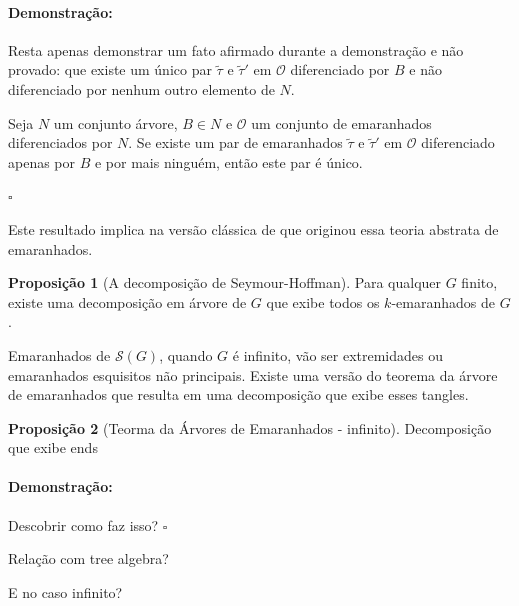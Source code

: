 \documentclass[11pt]{article}
\newcommand{\pulinho}{\vspace{.5cm}}
\theoremstyle{definition}
\theoremstyle{definition}
\theoremstyle{definition}
\newtheorem{prop}{Proposição}
\newenvironment{proposicao}{
\definecolor{shadecolor}{HTML}{FFDBDF}
\begin{shaded}
\begin{prop}
}
{
\end{prop}
\end{shaded}
}
\theoremstyle{definition}
\theoremstyle{definition}
\theoremstyle{definition}
\theoremstyle{definition}
\theoremstyle{definition}
\theoremstyle{definition}
\theoremstyle{definition}
\theoremstyle{definition}
\theoremstyle{definition}
\newtheorem*{veronica*}{Lema}
\newenvironment{lema*}{
\definecolor{shadecolor}{HTML}{FFF1F2}
\begin{shaded}
\begin{veronica*}
}
{
\end{veronica*}
\end{shaded}
}
\newenvironment{prova}{\paragraph{Demonstração:}}{\hfill$\square$ 
\pulinho
}
\theoremstyle{definition}
\begin{document}
\begin{prova}
Resta apenas demonstrar um fato afirmado durante a demonstração e não provado: que existe um único par $\tilde{\tau}$ e $\tilde{\tau}'$ em $\mathcal{O}$ diferenciado por $B$ e não diferenciado por nenhum outro elemento de $N$.

\begin{lema*}
  Seja $N$ um conjunto árvore, $B \in N$ e $\mathcal{O}$ um conjunto de emaranhados diferenciados por $N$. Se existe um par de emaranhados $\tilde{\tau}$ e $\tilde{\tau}'$ em $\mathcal{O}$ diferenciado apenas por $B$ e por mais ninguém, então este par é único.
\end{lema*}






\end{prova}

Este resultado implica na versão clássica de \cite{original} que originou essa teoria abstrata de emaranhados.

\begin{proposicao}[A decomposição de Seymour-Hoffman]
  Para qualquer $G$ finito, existe uma decomposição em árvore de $G$ que exibe todos os $k$-emaranhados de $G$.
\end{proposicao}

Emaranhados de $\mathcal{S}(G)$, quando $G$ é infinito, vão ser extremidades ou emaranhados esquisitos não principais. Existe uma versão do teorema da árvore de emaranhados que resulta em uma decomposição que exibe esses tangles.

\begin{proposicao}[Teorma da Árvores de Emaranhados - infinito]
  Decomposição que exibe ends
\end{proposicao}
\begin{prova}
  Descobrir como faz isso?
\end{prova}









Relação com tree algebra?

E no caso infinito?



\end{document}
